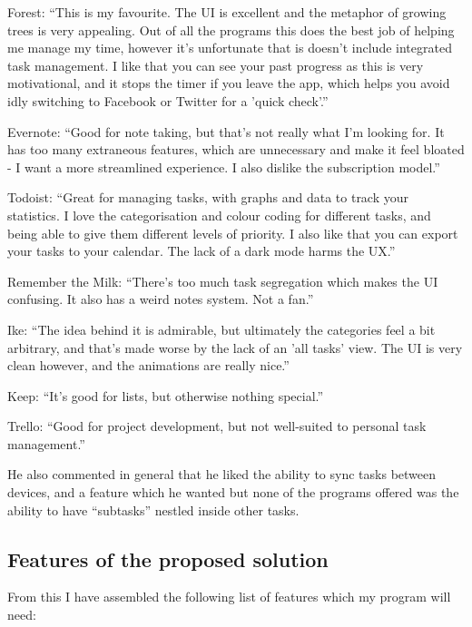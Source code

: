 \documentclass{article}
\begin{document}
\begin{description}
	\item Forest: ``This is my favourite. The UI is excellent and the metaphor of
	      growing trees is very appealing. Out of all the programs this does the best
	      job of helping me manage my time, however it's unfortunate that is doesn't
	      include integrated task management. I like that you can see your past progress
	      as this is very motivational, and it stops the timer if you leave the app,
	      which helps you avoid idly switching to Facebook or Twitter for a 'quick
	      check'.''
	\item Evernote: ``Good for note taking, but that's not really what I'm looking
	      for. It has too many extraneous features, which are unnecessary and make it
	      feel bloated - I want a more streamlined experience. I also dislike the
	      subscription model.''
	\item Todoist: ``Great for managing tasks, with graphs and data to track your
	      statistics. I love the categorisation and colour coding for different tasks,
	      and being able to give them different levels of priority. I also like that you
	      can export your tasks to your calendar. The lack of a dark mode harms the
	      UX.''
	\item Remember the Milk: ``There's too much task segregation which makes the UI
	      confusing. It also has a weird notes system. Not a fan.''
	\item Ike: ``The idea behind it is admirable, but ultimately the categories feel
	      a bit arbitrary, and that's made worse by the lack of an 'all tasks' view. The
	      UI is very clean however, and the animations are really nice.''
	\item Keep: ``It's good for lists, but otherwise nothing special.''
	\item Trello: ``Good for project development, but not well-suited to personal
	      task management.''
\end{description}

He also commented in general that he liked the ability to sync tasks between
devices, and a feature which he wanted but none of the programs offered was the
ability to have ``subtasks'' nestled inside other tasks.

\subsection{Features of the proposed solution}
From this I have assembled the following list of features which my program will
need:
\end{document}
